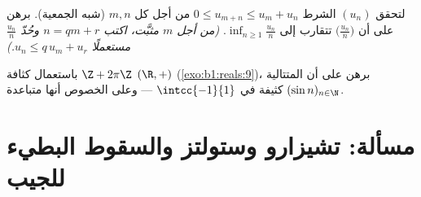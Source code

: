 \begin{exercise}[$\star\star\star$]\label{exo:b1:seq:11}
لتحقق $(u_n)$ الشرط $0 \leq u_{m+n} \leq u_m + u_n$ من أجل كل $m, n$
(شبه الجمعية). برهن على أن $\bigl(\frac{u_n}{n}\bigr)$ تتقارب إلى
$\inf_{n \geq 1} \frac{u_n}{n}$. \emph{(من أجل $m$ مثبَّت، اكتب $n = qm
+ r$ وحُدّ $\frac{u_n}{n}$ مستعملًا $u_n \leq q\,u_m + u_r$.)}
\end{exercise}

\begin{exercise}[$\star\star\star$]\label{exo:b1:seq:12}
باستعمال كثافة  $\Z + 2\pi\Z$  $(\R, +)$
(\cref{exo:b1:reals:9})، برهن على أن المتتالية $(\sin n)_{n \in
\N}$ كثيفة في $\intcc{-1}{1}$ --- وعلى الخصوص أنها متباعدة.
\end{exercise}

\section{مسألة: تشيزارو وستولتز والسقوط البطيء للجيب}

